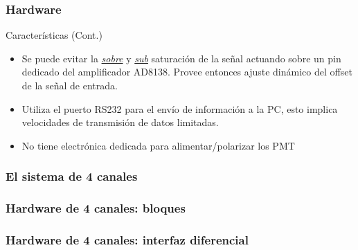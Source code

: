 \documentclass{beamer}
\begin{document}
\begin{frame}
	\frametitle{Hardware}
		\begin{exampleblock}{Características (Cont.)}
			\begin{itemize}
				\item Se puede evitar la \underline{\textit{sobre}} y
							\underline{\textit{sub}} saturación de la señal actuando
							sobre un pin dedicado del amplificador AD8138. Provee entonces
							\alert{ajuste dinámico del offset} de la señal de entrada.
				\item Utiliza el puerto RS232 para el envío de información a la PC, esto
							implica velocidades de transmisión de datos limitadas.
				\item No tiene electrónica dedicada para alimentar/polarizar los PMT
			\end{itemize}
		\end{exampleblock}
\end{frame}

\begin{frame}
  \frametitle{El sistema de 4 canales}
  \begin{block}{}
    \begin{center}
		\end{center}
  \end{block}
\end{frame}

\begin{frame}
  \frametitle{Hardware de 4 canales: bloques}
  \begin{block}{}
    \begin{center}
		\end{center}
  \end{block}
\end{frame}

\begin{frame}
  \frametitle{Hardware de 4 canales: interfaz diferencial}
  \begin{block}{}
    \begin{center}
		\end{center}
  \end{block}
\end{frame}
\end{document}
